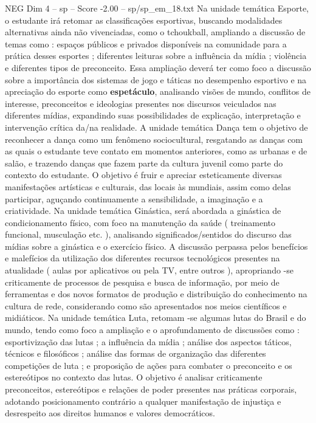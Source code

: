 \begin{textsample}{NEG Dim 4 – sp – Score -2.00 – sp/sp\_em\_18.txt}
Na unidade temática Esporte, o estudante irá retomar as classificações esportivas, buscando modalidades alternativas ainda não vivenciadas, como o tchoukball, ampliando a discussão de temas como : espaços públicos e privados disponíveis na comunidade para a prática desses esportes ; diferentes leituras sobre a influência da mídia ; violência e diferentes tipos de preconceito.
Essa ampliação deverá ter como foco a discussão sobre a importância dos sistemas de jogo e táticas no desempenho esportivo e na apreciação do esporte como \textbf{espetáculo}, analisando visões de mundo, conflitos de interesse, preconceitos e ideologias presentes nos discursos veiculados nas diferentes mídias, expandindo suas possibilidades de explicação, interpretação e intervenção crítica da/na realidade.
A unidade temática Dança tem o objetivo de reconhecer a dança como um fenômeno sociocultural, resgatando as danças com as quais o estudante teve contato em momentos anteriores, como as urbanas e de salão, e trazendo danças que fazem parte da cultura juvenil como parte do contexto do estudante.
O objetivo é fruir e apreciar esteticamente diversas manifestações artísticas e culturais, das locais às mundiais, assim como delas participar, aguçando continuamente a sensibilidade, a imaginação e a criatividade.
Na unidade temática Ginástica, será abordada a ginástica de condicionamento físico, com foco na manutenção da saúde ( treinamento funcional, musculação etc. ), analisando significados/sentidos do discurso das mídias sobre a ginástica e o exercício físico.
A discussão perpassa pelos benefícios e malefícios da utilização dos diferentes recursos tecnológicos presentes na atualidade ( aulas por aplicativos ou pela TV, entre outros ), apropriando -se criticamente de processos de pesquisa e busca de informação, por meio de ferramentas e dos novos formatos de produção e distribuição do conhecimento na cultura de rede, considerando como são apresentados nos meios científicos e midiáticos.
Na unidade temática Luta, retomam -se algumas lutas do Brasil e do mundo, tendo como foco a ampliação e o aprofundamento de discussões como : esportivização das lutas ; a influência da mídia ; análise dos aspectos táticos, técnicos e filosóficos ; análise das formas de organização das diferentes competições de luta ; e proposição de ações para combater o preconceito e os estereótipos no contexto das lutas.
O objetivo é analisar criticamente preconceitos, estereótipos e relações de poder presentes nas práticas corporais, adotando posicionamento contrário a qualquer manifestação de injustiça e desrespeito aos direitos humanos e valores democráticos.

\end{textsample}
